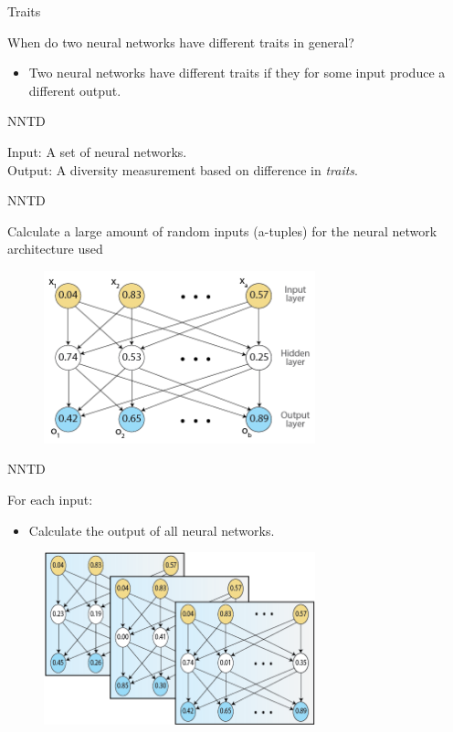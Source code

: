 \begin{frame}{Traits}
\begin{center}
  When do two neural networks have different traits in general?
  \begin{itemize}
	\item Two neural networks have different traits if they for some input produce a different output.
  \end{itemize}
  \end{center}
\end{frame}

\begin{frame}{NNTD}
\begin{center}
  Input: A set of neural networks.\\
  Output: A diversity measurement based on difference in \emph{traits}.
\end{center}
\end{frame}

\begin{frame}{NNTD}
\begin{center}
Calculate a large amount of random inputs (a-tuples) for the neural network architecture used
 \begin{figure}[p]
  \includegraphics[width=0.7\textwidth]{images/neuralnetwork.png}
  \end{figure}
\end{center}
\end{frame}

\begin{frame}{NNTD}
\begin{center}
For each input:
  \begin{itemize}
      \item Calculate the output of all neural networks.
  \end{itemize}
   \begin{figure}[p]
  \includegraphics[width=0.7\textwidth]{images/neuralnetworkvalues.png}
  \end{figure}
\end{center}
\end{frame}

